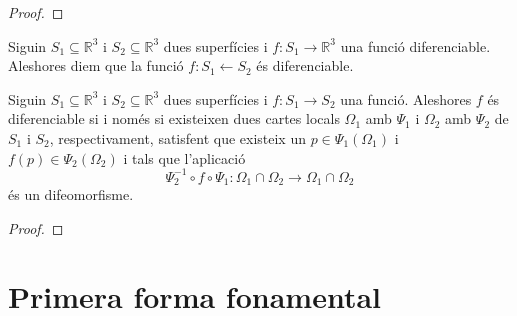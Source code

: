 \documentclass[../Apunts.tex]{subfiles}
\begin{document}
	\begin{proof}
	\end{proof}
	\begin{definition}
		\label{def:funció diferenciable entre superfícies}
		Siguin \(S_{1}\subseteq\mathbb{R}^{3}\) i \(S_{2}\subseteq\mathbb{R}^{3}\) dues superfícies i \(f\colon S_{1}\longrightarrow\mathbb{R}^{3}\) una funció diferenciable. Aleshores diem que la funció \(f\colon S_{1}\longleftarrow S_{2}\) és diferenciable.
	\end{definition}
	\begin{proposition}
		Siguin \(S_{1}\subseteq\mathbb{R}^{3}\) i \(S_{2}\subseteq\mathbb{R}^{3}\) dues superfícies i \(f\colon S_{1}\longrightarrow S_{2}\) una funció. Aleshores \(f\) és diferenciable si i només si existeixen dues cartes locals \(\Omega_{1}\) amb \(\Psi_{1}\) i \(\Omega_{2}\) amb \(\Psi_{2}\) de \(S_{1}\) i \(S_{2}\), respectivament, satisfent que existeix un \(p\in\Psi_{1}(\Omega_{1})\) i \(f(p)\in\Psi_{2}(\Omega_{2})\) i tals que l'aplicació
		\[\Psi_{2}^{-1}\circ f\circ \Psi_{1}\colon\Omega_{1}\cap\Omega_{2}\longrightarrow\Omega_{1}\cap\Omega_{2}\]
		és un difeomorfisme.
	\end{proposition}
	\begin{proof}
	\end{proof}
	\section{Primera forma fonamental}
\end{document}
